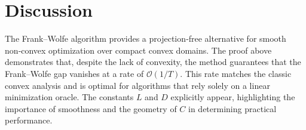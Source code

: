 \documentclass{article}
\begin{document}
\section*{Discussion}
The Frank–Wolfe algorithm provides a projection‑free alternative for smooth non‑convex optimization over compact convex domains. The proof above demonstrates that, despite the lack of convexity, the method guarantees that the Frank–Wolfe gap vanishes at a rate of $\mathcal{O}(1/T)$. This rate matches the classic convex analysis and is optimal for algorithms that rely solely on a linear minimization oracle. The constants $L$ and $D$ explicitly appear, highlighting the importance of smoothness and the geometry of $C$ in determining practical performance.
\end{document}
